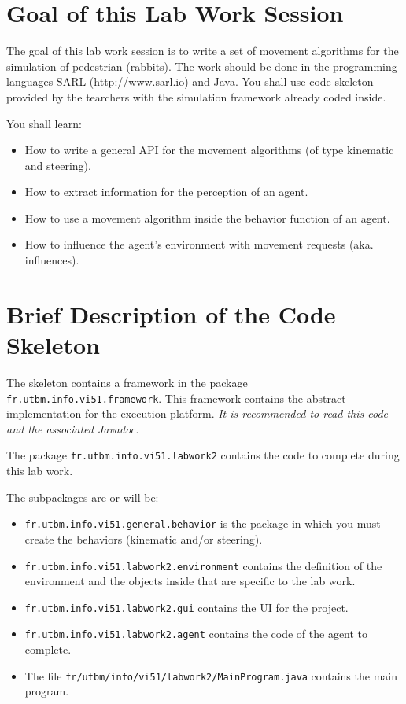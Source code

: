 \documentclass[article,english,nodocumentinfo]{multiagentfrreport}
\begin{document}
\section{Goal of this Lab Work Session}

The goal of this lab work session is to write a set of movement algorithms for the simulation of pedestrian (rabbits).
The work should be done in the programming languages SARL (\url{http://www.sarl.io}) and Java.
You shall use code skeleton provided by the tearchers with the simulation framework already coded inside.

You shall learn: 
\begin{itemize}
\item How to write a general API for the movement algorithms (of type kinematic and steering).
\item How to extract information for the perception of an agent.
\item How to use a movement algorithm inside the behavior function of an agent.
\item How to influence the agent's environment with movement requests (aka. influences).
\end{itemize}



\section{Brief Description of the Code Skeleton}

The skeleton contains a framework in the package \texttt{fr.utbm.info.vi51.framework}.
This framework contains the abstract implementation for the execution platform.
\emph{It is recommended to read this code and the associated Javadoc.}

The package \texttt{fr.utbm.info.vi51.labwork2} contains the code to complete during this lab work.

The subpackages are or will be:
\begin{itemize}
\item \texttt{fr.utbm.info.vi51.general.behavior} is the package in which you must create the behaviors (kinematic and/or steering).
\item \texttt{fr.utbm.info.vi51.labwork2.environment} contains the definition of the environment and the objects inside that are specific to the lab work.
\item \texttt{fr.utbm.info.vi51.labwork2.gui} contains the UI for the project.
\item \texttt{fr.utbm.info.vi51.labwork2.agent} contains the code of the agent to complete.
\item The file \texttt{fr/utbm/info/vi51/labwork2/MainProgram.java} contains the main program.
\end{itemize}
\end{document}
